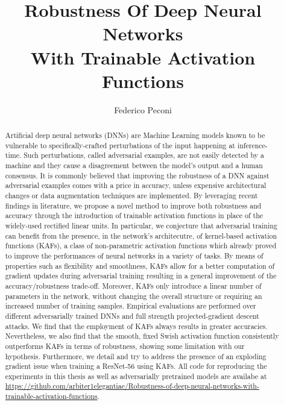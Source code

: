 \documentclass[LaM,binding=0.6cm]{./packages/sapthesis/sapthesis}
\title{Robustness Of Deep Neural Networks \\With Trainable Activation Functions}
\author{Federico Peconi}
\begin{document}
\frontmatter

\maketitle
\dedication{To my parents}

\begin{abstract}
Artificial deep neural networks (DNNs) are Machine Learning models known to be vulnerable to specifically-crafted perturbations of the input happening at inference-time.
Such perturbations, called adversarial examples, are not easily detected by a machine and they cause a disagreement between the model's output and a human consensus. 
It is commonly believed that improving the robustness of a DNN against adversarial examples comes with a price in accuracy, unless expensive architectural changes or data augmentation techniques 
are implemented. By leveraging recent findings in literature, we propose a novel method to improve both robustness and accuracy through the introduction of trainable activation
functions in place of the widely-used rectified linear units. In particular, we conjecture that adversarial training can benefit from the presence, in the network's architecutre, of 
kernel-based activation functions (KAFs), a class of non-parametric activation functions which already proved to improve the performances of neural networks in a variety of tasks.
By means of properties such as flexibility and smoothness, KAFs allow for a better computation of gradient updates during adversarial training resulting in a general improvement of the 
accuracy/robustness trade-off. Moreover, KAFs only introduce a linear number of parameters in the network, without changing the overall structure or requiring an increased number of training 
samples. Empirical evaluations are performed over different adversarially trained DNNs and full strength projected-gradient descent attacks. We find that the employment of KAFs always 
results in greater accuracies. Nevertheless, we also find that the smooth, fixed Swish activation function consistently outperforms KAFs in terms of robustness, showing some limitation with 
our hypothesis. Furthermore, we detail and try to address the presence of an exploding gradient issue when training a ResNet-56 using KAFs.
All code for reproducing the experiments in this thesis as well as adversarially pretrained models are availabe at \url{https://github.com/arbiter1elegantiae/Robustness-of-deep-neural-networks-with-trainable-activation-functions}.
\end{abstract}
\end{document}
